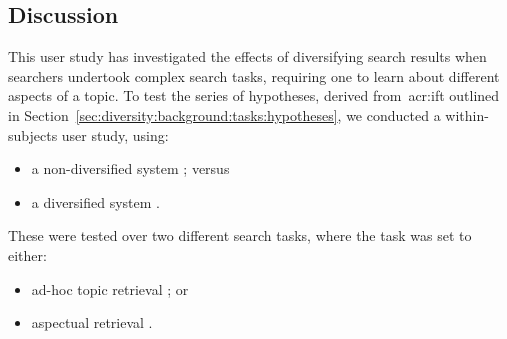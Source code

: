 \subsection{Discussion}\label{sec:diversity:users:discussion}
This user study has investigated the effects of diversifying search results when searchers undertook complex search tasks, requiring one to learn about different aspects of a topic. To test the series of hypotheses, derived from~\gls{acr:ift} outlined in Section~\ref{sec:diversity:background:tasks:hypotheses}, we conducted a within-subjects user study, using:

\vspace*{-2mm}
\begin{itemize}
    \item{a non-diversified system ; versus}
    \item{a diversified system .}
\end{itemize}

These were tested over two different search tasks, where the task was set to either:

\vspace*{-2mm}
\begin{itemize}
    \item{ad-hoc topic retrieval ; or}
    \item{aspectual retrieval .}
\end{itemize}

